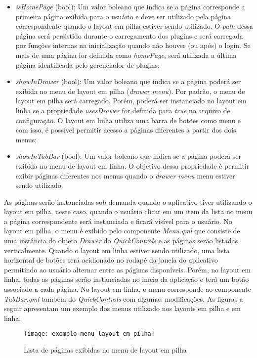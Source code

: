 \begin{itemize}
	\item \textit{isHomePage} (bool): Um valor boleano que indica se a página corresponde a primeira página exibida para o usuário e deve ser utilizado pela página correspondente quando o layout em pilha estiver sendo utilizado. O \textit{path} dessa página será persistido durante o carregamento dos plugins e será carregada por funções internas na inicialização quando não houver (ou após) o login. Se mais de uma página for definida como \textit{homePage}, será utilizada a última página identificada pelo gerenciador de plugins;

	\item \textit{showInDrawer} (bool): Um valor boleano que indica se a página poderá ser exibida no menu de layout em pilha (\textit{drawer menu}). Por padrão, o menu de layout em pilha será carregado. Porém, poderá ser instanciado no layout em linha se a propriedade \textit{usesDrawer} for definida para \textit{true} no arquivo de configuração. O layout em linha utiliza uma barra de botões como menu e com isso, é possível permitir acesso a páginas diferentes a partir dos dois menus;

	\item \textit{showInTabBar} (bool): Um valor boleano que indica se a página poderá ser exibida no menu de layout em linha. O objetivo dessa propriedade é permitir exibir páginas diferentes nos menus quando o \textit{drawer menu} menu estiver sendo utilizado.
\end{itemize}

As páginas serão instanciadas sob demanda quando o aplicativo tiver utilizando o layout em pilha, neste caso, quando o usuário clicar em um item da lista no menu a página correspondente será instanciada e ficará visível para o usuário. No layout em pilha, o menu é exibido pelo componente \textit{Menu.qml} que consiste de uma instância do objeto \textit{Drawer} do \textit{QuickControls} e as páginas serão listadas verticalmente. Quando o layout em linha estiver sendo utilizado, uma lista horizontal de botões será acidionado no rodapé da janela do aplicativo permitindo ao usuário alternar entre as páginas disponíveis. Porém, no layout em linha, todas as páginas serão instanciadas no início da aplicação e terá um botão associado a cada página. No layout em linha, o menu corresponde ao componente \textit{TabBar.qml} também do \textit{QuickControls} com algumas modificações. As figuras a seguir apresentam um exemplo dos menus utilizado nos layouts em pilha e em linha.

\begin{figure}[H]
	\texttt{[image: exemplo\_menu\_layout\_em\_pilha]}
	\centering
	\caption{Lista de páginas exibidas no menu de layout em pilha}
\end{figure}

